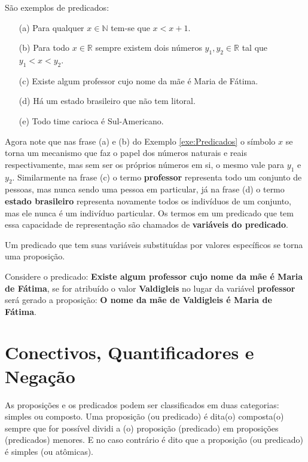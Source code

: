 \begin{example}\label{exe:Predicados}
	São exemplos de predicados:
	\begin{itemize}
		\item[(a)] Para qualquer $x \in \mathbb{N}$ tem-se que $x < x + 1$.
		\item[(b)] Para todo $x \in \mathbb{R}$ sempre existem dois números $y_1, y_2 \in \mathbb{R}$ tal que $y_1 < x < y_2$.
		\item[(c)] Existe algum professor cujo nome da mãe é Maria de Fátima.
		\item[(d)] Há um estado brasileiro que não tem litoral.
		\item[(e)] Todo time carioca é Sul-Americano.
	\end{itemize}
\end{example}

Agora note que nas frase (a) e (b) do Exemplo \ref{exe:Predicados} o símbolo $x$ se torna um mecanismo que faz o papel dos números naturais e reais respectivamente, mas sem ser os próprios números em si, o mesmo vale para $y_1$ e $y_2$. Similarmente na frase (c) o termo \textbf{professor} representa todo um conjunto de pessoas, mas nunca sendo uma pessoa em particular, já na frase (d) o termo \textbf{estado brasileiro} representa novamente todos os indivíduos de um conjunto, mas ele nunca é um indivíduo particular. Os termos em um predicado que tem essa capacidade de representação são chamados de \textbf{variáveis do predicado}.

\begin{remark}
    Um predicado que tem suas variáveis substituídas por valores específicos se torna uma proposição. 
\end{remark}

\begin{example}\label{exe:AtribuirVariavelPredicado}
	Considere o predicado: \textbf{Existe algum professor cujo nome da mãe é Maria de Fátima}, se for atribuído o valor  \textbf{Valdigleis} no lugar da variável \textbf{professor} será gerado a proposição: \textbf{O nome da mãe de Valdigleis é Maria de Fátima}.
\end{example}

\section{Conectivos, Quantificadores e Negação}\label{sec:Conectivo-Quantificador-Negacao}

As proposições e os predicados podem ser classificados em duas categorias: simples ou composto. Uma proposição (ou predicado) é dita(o) composta(o) sempre que for possível dividi a (o) proposição (predicado) em proposições (predicados) menores. E no caso contrário é dito que a proposição (ou predicado) é simples (ou atômicas).

